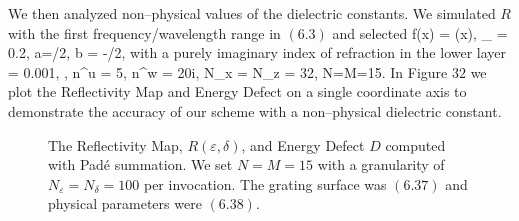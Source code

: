 We then analyzed non--physical values of the dielectric constants. We simulated $R$ with the first frequency/wavelength range in $(6.3)$ and selected
\be
f(x) = \cos(x),
\quad
\varepsilon_{} = 0.2,
\quad 
a=\pi/2, 
\quad 
b = -\pi/2,
\ee
with a purely imaginary index of refraction in the lower layer
\be
\alpha = 0.001,
\quad
{},
\quad
n^u = 5,
\quad
n^w = 20i,
\quad
N_x = N_z = 32,
\quad
N=M=15.
\ee
In Figure $32$ we plot the
Reflectivity Map and Energy Defect on a single coordinate axis to demonstrate the accuracy of our
scheme with a non--physical dielectric constant.

%
%
\vspace{-23mm}
\begin{figure}[H]
    \centering
    \vspace{.15mm}
    \caption{The Reflectivity Map, $R(\varepsilon,\delta)$, and Energy Defect $D$
    computed with Pad\'e summation. We set $N=M=15$ 
    with a granularity of $N_{\varepsilon}=N_{\delta}=100$ per invocation. The grating surface was $(6.37)$ and physical parameters were $(6.38)$.}
    \label{Fig:RM:Single Case 1}
\end{figure}
